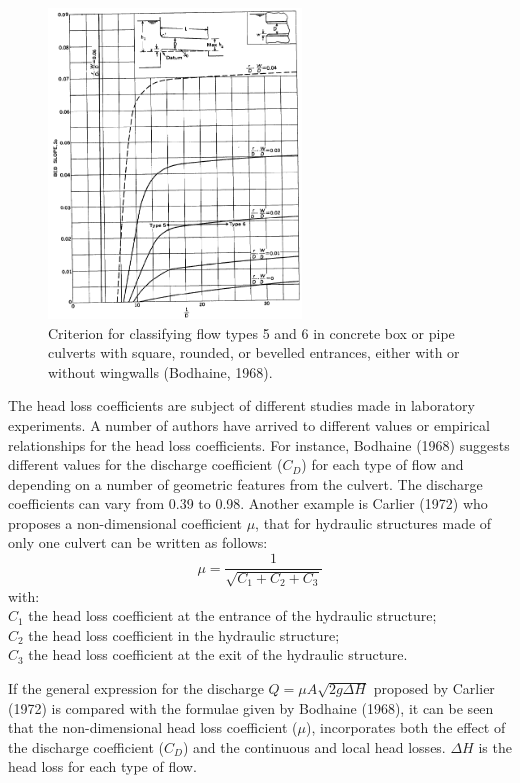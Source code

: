 \begin{figure}[H]
\begin{center}
  \includegraphics[width=0.6\textwidth]{culvert_fig4.png}
\end{center}
\caption{Criterion for classifying flow types 5 and 6 in concrete box or pipe culverts
with square, rounded, or bevelled entrances, either with or without wingwalls (Bodhaine, 1968).}
\label{fig:culvert_fig4}
\end{figure}

The head loss coefficients are subject of different studies made in laboratory experiments.
A number of authors have arrived to different values or empirical relationships for the
head loss coefficients. For instance, Bodhaine (1968) suggests different values for
the discharge coefficient ($C_D$) for each type of flow and depending on a number of
geometric features from the culvert. The discharge coefficients can vary from 0.39 to 0.98.
Another example is Carlier (1972) who proposes a non-dimensional coefficient $\mu$,
that for hydraulic structures made of only one culvert can be written as follows:
\begin{equation}
\mu = \dfrac{1}{\sqrt{C_1+C_2+C_3}}
\end{equation}
with:\\
$C_1$ the head loss coefficient at the entrance of the hydraulic structure;\\
$C_2$ the head loss coefficient in the hydraulic structure;\\
$C_3$ the head loss coefficient at the exit of the hydraulic structure.

If the general expression for the discharge $Q=\mu A \sqrt{2g\Delta H}$ proposed by
Carlier (1972) is compared with the formulae given by Bodhaine (1968),
it can be seen that the non-dimensional head loss coefficient ($\mu$),
incorporates both the effect of the discharge coefficient ($C_D$) and the continuous
and local head losses. $\Delta H$ is the head loss for each type of flow.

